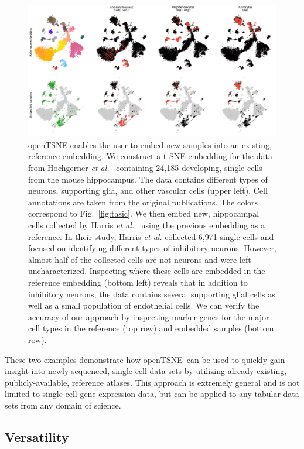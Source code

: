 \documentclass[twocolumn]{bmcart}
\newcommand{\opentsne}{\textsf{openTSNE}}
\begin{document}
\begin{figure}[htbp]
  \includegraphics[width=\textwidth]{transform_hochgerner}
  \caption{\label{fig:transform}openTSNE enables the user to embed new samples
	into an existing, reference embedding. We construct a t-SNE embedding
	for the data from Hochgerner \textit{et
	al.}~\cite{hochgerner2018conserved} containing 24,185 developing,
	single cells from the mouse hippocampus. The data contains different
	types of neurons, supporting glia, and other vascular cells (upper
	left). Cell annotations are taken from the original publications. The
	colors correspond to Fig.~\ref{fig:tasic}. We then embed new,
	hippocampal cells collected by Harris \textit{et
	al.}~\cite{harris2018classes} using the previous embedding as a
	reference. In their study, Harris \textit{et al.} collected 6,971
	single-cells and focused on identifying different types of inhibitory
	neurons. However, almost half of the collected cells are not neurons
	and were left uncharacterized. Inspecting where these cells are
	embedded in the reference embedding (bottom left) reveals that in
	addition to inhibitory neurons, the data contains several supporting
	glial cells as well as a small population of endothelial cells. We can
	verify the accuracy of our approach by inspecting marker genes for the
	major cell types in the reference (top row) and embedded samples
	(bottom row).}
\end{figure}

These two examples demonstrate how \opentsne\ can be used to quickly gain
insight into newly-sequenced, single-cell data sets by utilizing already
existing, publicly-available, reference atlases. This approach is extremely
general and is not limited to single-cell gene-expression data, but can be
applied to any tabular data sets from any domain of science.

\subsection*{Versatility}
\end{document}
